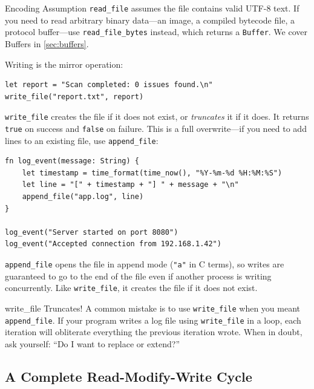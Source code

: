 \begin{notebox}{Encoding Assumption}
\lstinline|read_file| assumes the file contains valid UTF-8 text. If you need
to read arbitrary binary data---an image, a compiled bytecode file, a
protocol buffer---use \lstinline|read_file_bytes| instead, which returns a
\lstinline|Buffer|. We cover Buffers in \cref{sec:buffers}.
\end{notebox}

Writing is the mirror operation:

\begin{lstlisting}[language=Lattice, caption={Writing a string to a file}]
let report = "Scan completed: 0 issues found.\n"
write_file("report.txt", report)
\end{lstlisting}

\lstinline|write_file| creates the file if it does not exist, or
\emph{truncates} it if it does. It returns \lstinline|true| on success and
\lstinline|false| on failure. This is a full overwrite---if you need to add
lines to an existing file, use \lstinline|append_file|:

\begin{lstlisting}[language=Lattice, caption={Appending to a log file}]
fn log_event(message: String) {
    let timestamp = time_format(time_now(), "%Y-%m-%d %H:%M:%S")
    let line = "[" + timestamp + "] " + message + "\n"
    append_file("app.log", line)
}

log_event("Server started on port 8080")
log_event("Accepted connection from 192.168.1.42")
\end{lstlisting}

\lstinline|append_file| opens the file in append mode (\texttt{"a"} in C
terms), so writes are guaranteed to go to the end of the file even if another
process is writing concurrently. Like \lstinline|write_file|, it creates the
file if it does not exist.

\begin{warnbox}{write\_file Truncates!}
A common mistake is to use \lstinline|write_file| when you meant
\lstinline|append_file|. If your program writes a log file using
\lstinline|write_file| in a loop, each iteration will obliterate everything
the previous iteration wrote. When in doubt, ask yourself: ``Do I want to
replace or extend?''
\end{warnbox}

\subsection{A Complete Read-Modify-Write Cycle}\label{sec:read-modify-write}

